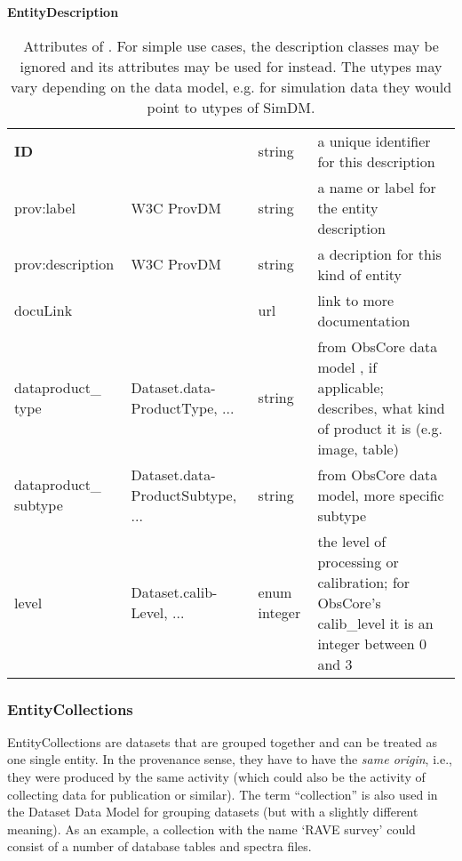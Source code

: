 \begin{table}[h]
\small
{}\textwidth
\textbf{\normalsize EntityDescription}\vspace{0.25em}\\
\begin{tabulary}{\textwidth}{@{}p{2.75cm}p{3cm}lL@{}}
\toprule
{} &  &  & \\
\midrule
\textbf{ID} & & string & a unique identifier for this description\\
prov:label  & W3C ProvDM & string & a name or label for the entity description\\
prov:description  & W3C ProvDM & string & a decription for this kind of entity\\
docuLink &  & url & link to more documentation\\
dataproduct\_ type  & Dataset.data-ProductType, ... & string       & from ObsCore data model \citep{std:ObsCore}, if applicable; describes, what kind of product it is (e.g. image, table)\\
dataproduct\_ subtype & Dataset.data-ProductSubtype, ... & string       & from ObsCore data model, more specific subtype\\
level   & Dataset.calib-Level, ... & enum integer & the level of processing or calibration; for ObsCore's calib\_level it is an integer between 0 and 3\\
\bottomrule
\end{tabulary}
\caption{Attributes of . For simple use cases, 
the description classes may be ignored and its attributes may be used for 
 instead. 
The utypes may vary depending on the data model, e.g. for simulation data they 
would point to utypes of SimDM.
}\label{tab:entitydescription-attributes}
\end{table}


\subsubsection{EntityCollections}
EntityCollections are datasets that are grouped together and can be treated as one single entity. 
In the provenance sense, they have to have the \emph{same origin}, i.e., they were 
produced by the same activity (which could also be the activity of collecting
data for publication or similar). The term ``collection'' is 
also used in the Dataset Data Model for grouping datasets (but with a slightly different meaning). 
As an example, a collection 
with the name `RAVE survey' could consist of a number of database tables and spectra files.

